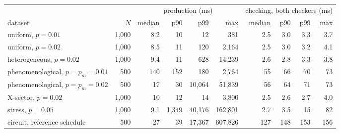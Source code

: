 \begin{tabular}{@{}lrrrrrrrrr@{}}
\toprule
 & & \multicolumn{4}{c}{production (ms)} & \multicolumn{4}{c}{checking, both checkers (ms)} \\
\cmidrule(lr){3-6}\cmidrule(l){7-10}
dataset & $N$ & median & p90 & p99 & max & median & p90 & p99 & max \\
\midrule
uniform, $p=0.01$ & 1{,}000 & 8.2 & 10 & 12 & 381 & 2.5 & 3.0 & 3.3 & 3.7 \\
uniform, $p=0.02$ & 1{,}000 & 8.5 & 11 & 120 & 2{,}164 & 2.5 & 3.0 & 3.2 & 4.1 \\
heterogeneous, $p=0.02$ & 1{,}000 & 9.4 & 11 & 628 & 14{,}239 & 2.6 & 2.8 & 3.3 & 3.8 \\
phenomenological, $p=p_m=0.01$ & 500 & 140 & 152 & 180 & 2{,}764 & 55 & 66 & 70 & 73 \\
phenomenological, $p=p_m=0.02$ & 500 & 17 & 30 & 10{,}064 & 51{,}839 & 56 & 64 & 71 & 73 \\
X-sector, $p=0.02$ & 1{,}000 & 10 & 12 & 14 & 3{,}800 & 2.5 & 2.6 & 2.7 & 4.0 \\
stress, $p=0.05$ & 1{,}000 & 9.1 & 1{,}349 & 40{,}176 & 162{,}801 & 2.7 & 3.5 & 15 & 82 \\
circuit, reference schedule & 500 & 27 & 39 & 17{,}367 & 607{,}826 & 127 & 148 & 153 & 156 \\
\bottomrule
\end{tabular}
